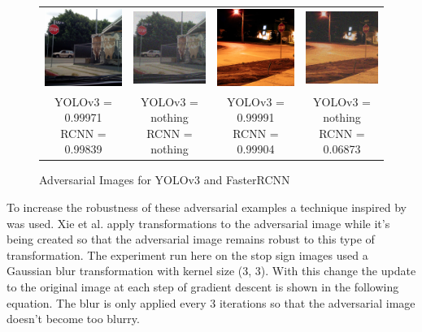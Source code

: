 \documentclass{article}
\begin{document}
\begin{figure}[h]
\begin{tabular}{c c@{\hskip 1cm} c c}
        \includegraphics[width=0.2\linewidth]{../test_images/stop3.png} &  \includegraphics[width=0.2\linewidth]{../test_images/ensemble_adversarials/stop3.png} & 
        \includegraphics[width=0.2\linewidth]{../test_images/stop4.png} &  \includegraphics[width=0.2\linewidth]{../test_images/ensemble_adversarials/stop4.png} \\

        \makecell[t]{YOLOv3 = 0.99971 \\ RCNN = 0.99839} & \makecell[t]{YOLOv3 = nothing \\ RCNN = nothing} & \makecell[t]{YOLOv3 = 0.99991 \\ RCNN = 0.99904} & \makecell[t]{YOLOv3 = nothing \\ RCNN = 0.06873} \\
    \end{tabular}
\caption{Adversarial Images for YOLOv3 and FasterRCNN}
\label{fig:ensembleadversarial}
\end{figure}

To increase the robustness of these adversarial examples a technique inspired by \cite{xie2019improving} was used. Xie et al. apply transformations to the adversarial image while it's being created so that the adversarial image remains robust to this type of transformation. The experiment run here on the stop sign images used a Gaussian blur transformation with kernel size (3, 3). With this change the update to the original image at each step of gradient descent is shown in the following equation. The blur is only applied every 3 iterations so that the adversarial image doesn't become too blurry.
\end{document}
